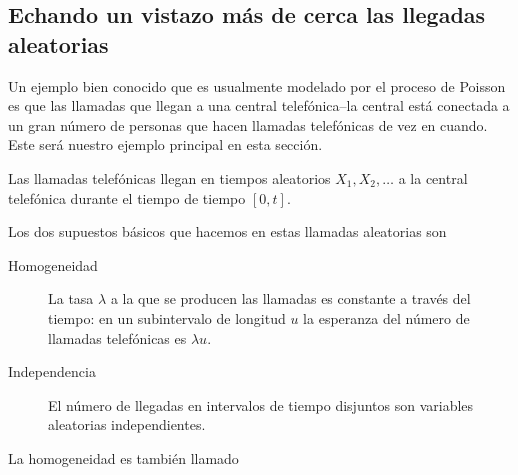 \subsection{Echando un vistazo más de cerca las llegadas aleatorias}

Un ejemplo bien conocido que es usualmente modelado por el proceso de Poisson es que las llamadas que llegan a una central telefónica--la central está conectada a un gran número de personas que hacen llamadas telefónicas de vez en cuando. Este será nuestro ejemplo principal en esta sección.

Las llamadas telefónicas llegan en tiempos aleatorios $X_{1}, X_{2}, \ldots$ a la central telefónica durante el tiempo de tiempo $\left[0,t\right]$.


Los dos supuestos básicos que hacemos en estas llamadas aleatorias son
\begin{description}
	\item[Homogeneidad] La tasa $\lambda$ a la que se producen las llamadas es constante a través del tiempo: en un subintervalo de longitud $u$ la esperanza del número de llamadas telefónicas es $\lambda u$.
	\item[Independencia] El número de llegadas en intervalos de tiempo disjuntos son variables aleatorias independientes.
\end{description}

La homogeneidad es también llamado \textit{}